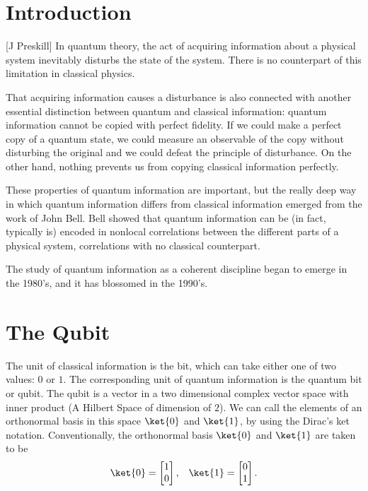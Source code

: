 \Contributor{}

\lstset{style=mystyle}


	\MakeScribeTop


\section{Introduction}
[J Preskill] In quantum theory, the act of acquiring information about a physical system inevitably disturbs the state of the system. There is no counterpart of this limitation in classical physics.

That acquiring information causes a disturbance is also connected with another essential distinction between quantum and classical information: quantum information cannot be copied with perfect fidelity. If we could make a perfect copy of a quantum state, we could measure an observable of the copy without disturbing the original and we could defeat the principle of disturbance. On the other hand, nothing prevents us from copying classical information perfectly.

These properties of quantum information are important, but the really deep way in which quantum information differs from classical information emerged from the work of John Bell. Bell showed that quantum information can be (in fact, typically is) encoded in nonlocal correlations between the different parts of a physical system, correlations with no classical counterpart. 

The study of quantum information as a coherent discipline began to emerge in the 1980’s, and it has blossomed in the 1990’s.

\section{The Qubit}
The unit of classical information is the bit, which can take either one of two values: \(0\) or \(1\). The corresponding unit of quantum information is the quantum bit or qubit. The qubit is a vector in a two dimensional complex vector space with inner product (A Hilbert Space of dimension of \(2\)). We can call the elements of an orthonormal basis in this space \(\ket{0}\) and \(\ket{1}\), by using the Dirac's ket notation. Conventionally, the orthonormal basis \(\ket{0}\) and \(\ket{1}\) are taken to be
\begin{align*}
    \ket{0} = \begin{bmatrix}
           1 \\
           0 
         \end{bmatrix}
    , \;\;\;
    \ket{1} = \begin{bmatrix}
           0 \\
           1 
         \end{bmatrix}.
  \end{align*}
  
